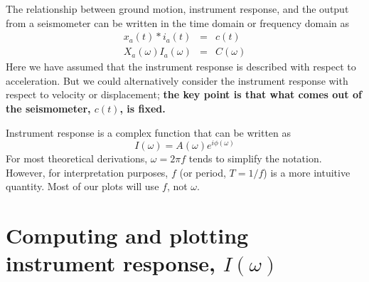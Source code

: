\documentclass[11pt,titlepage,fleqn]{article}
\begin{document}
The relationship between ground motion, instrument response, and the output from a seismometer can be written in the time domain or frequency domain as
%
\begin{eqnarray}
x_a(t) * i_a(t) &=& c(t)
\\
X_a(\omega) I_a(\omega) &=& C(\omega)
\end{eqnarray}
%
Here we have assumed that the instrument response is described with respect to acceleration. But we could alternatively consider the instrument response with respect to velocity or displacement; {\bf the key point is that what comes out of the seismometer, $c(t)$, is fixed.}

Instrument response is a complex function that can be written as
%
\begin{equation}
I(\omega) = A(\omega) e^{i \phi(\omega)}
\label{Iw}
\end{equation}
%
For most theoretical derivations, $\omega = 2\pi f$ tends to simplify the notation. However, for interpretation purposes, $f$ (or period, $T = 1/f$) is a more intuitive quantity. Most of our plots will use $f$, not $\omega$.


\section{Computing and plotting instrument response, $I(\omega)$}
\end{document}
